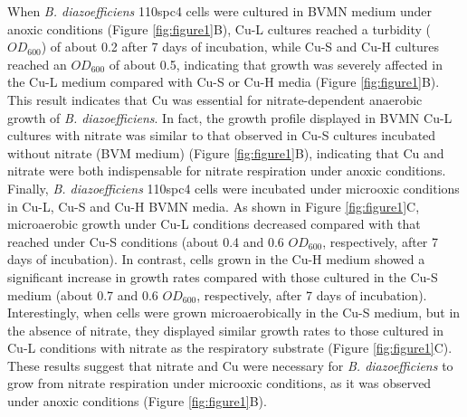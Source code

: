 \documentclass[a4paper,11pt]{article}
\begin{document}
When {\em B. diazoefficiens} 110spc4 cells were cultured in BVMN medium under anoxic
conditions (Figure \ref{fig:figure1}B), Cu-L cultures reached a turbidity ($OD_{600}$) of about 0.2 after 7 days
of incubation, while Cu-S and Cu-H cultures reached an $OD_{600}$ of about 0.5, indicating that
growth was severely affected in the Cu-L medium compared with Cu-S or Cu-H media
(Figure \ref{fig:figure1}B). This result indicates that Cu was essential for nitrate-dependent anaerobic
growth of {\em B. diazoefficiens}. In fact, the growth profile displayed in BVMN Cu-L cultures
with nitrate was similar to that observed in Cu-S cultures incubated without nitrate (BVM
medium) (Figure \ref{fig:figure1}B), indicating that Cu and nitrate were both indispensable for nitrate
respiration under anoxic conditions. Finally, {\em B. diazoefficiens} 110spc4 cells were incubated
under microoxic conditions in Cu-L, Cu-S and Cu-H BVMN media. As shown in Figure \ref{fig:figure1}C,
microaerobic growth under Cu-L conditions decreased compared with that reached under
Cu-S conditions (about 0.4 and 0.6 $OD_{600}$, respectively, after 7 days of incubation). In
contrast, cells grown in the Cu-H medium showed a significant increase in growth rates
compared with those cultured in the Cu-S medium (about 0.7 and 0.6 $OD_{600}$, respectively,
after 7 days of incubation). Interestingly, when cells were grown microaerobically in the Cu-S medium, but in the absence of nitrate, they displayed similar growth rates to
those cultured in Cu-L conditions with nitrate as the respiratory substrate (Figure \ref{fig:figure1}C).
These results suggest that nitrate and Cu were necessary for {\em B. diazoefficiens} to grow from
nitrate respiration under microoxic conditions, as it was observed under anoxic conditions
(Figure \ref{fig:figure1}B).
\end{document}
